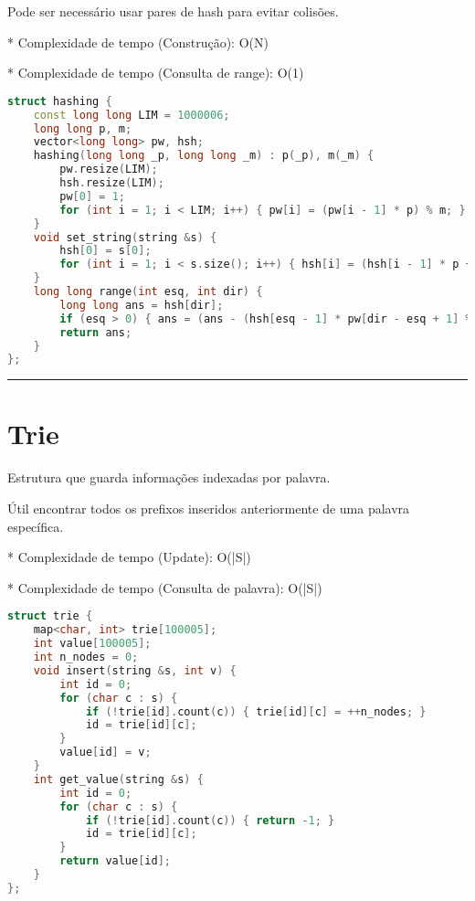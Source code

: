 \documentclass[11pt, a4paper, twoside]{book}
\begin{document}
Pode ser necessário usar pares de hash para evitar colisões.



* Complexidade de tempo (Construção): O(N)

* Complexidade de tempo (Consulta de range): O(1)


\hfill

\begin{lstlisting}[language=C++]
struct hashing {
    const long long LIM = 1000006;
    long long p, m;
    vector<long long> pw, hsh;
    hashing(long long _p, long long _m) : p(_p), m(_m) {
        pw.resize(LIM);
        hsh.resize(LIM);
        pw[0] = 1;
        for (int i = 1; i < LIM; i++) { pw[i] = (pw[i - 1] * p) % m; }
    }
    void set_string(string &s) {
        hsh[0] = s[0];
        for (int i = 1; i < s.size(); i++) { hsh[i] = (hsh[i - 1] * p + s[i]) % m; }
    }
    long long range(int esq, int dir) {
        long long ans = hsh[dir];
        if (esq > 0) { ans = (ans - (hsh[esq - 1] * pw[dir - esq + 1] % m) + m) % m; }
        return ans;
    }
};
\end{lstlisting}

\hfill

\rule{\textwidth}{0.4pt}

\section{Trie}



Estrutura que guarda informações indexadas por palavra.   



Útil encontrar todos os prefixos inseridos anteriormente de uma palavra específica.



* Complexidade de tempo (Update): O(|S|)

* Complexidade de tempo (Consulta de palavra): O(|S|)


\hfill

\begin{lstlisting}[language=C++]
struct trie {
    map<char, int> trie[100005];
    int value[100005];
    int n_nodes = 0;
    void insert(string &s, int v) {
        int id = 0;
        for (char c : s) {
            if (!trie[id].count(c)) { trie[id][c] = ++n_nodes; }
            id = trie[id][c];
        }
        value[id] = v;
    }
    int get_value(string &s) {
        int id = 0;
        for (char c : s) {
            if (!trie[id].count(c)) { return -1; }
            id = trie[id][c];
        }
        return value[id];
    }
};
\end{lstlisting}
\end{document}
